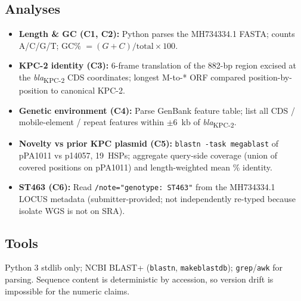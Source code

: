 \documentclass[11pt]{article}
\begin{document}
\subsection{Analyses}
\begin{itemize}[nosep]
  \item \textbf{Length \& GC (C1, C2):} Python parses the MH734334.1 FASTA; counts A/C/G/T; GC\% $= (G+C)/\text{total}\times 100$.
  \item \textbf{KPC-2 identity (C3):} 6-frame translation of the 882-bp region excised at the \textit{bla}\textsubscript{KPC-2} CDS coordinates; longest M-to-* ORF compared position-by-position to canonical KPC-2.
  \item \textbf{Genetic environment (C4):} Parse GenBank feature table; list all CDS / mobile-element / repeat features within $\pm 6$~kb of \textit{bla}\textsubscript{KPC-2}.
  \item \textbf{Novelty vs prior KPC plasmid (C5):} \texttt{blastn -task megablast} of pPA1011 vs p14057, 19~HSPs; aggregate query-side coverage (union of covered positions on pPA1011) and length-weighted mean \% identity.
  \item \textbf{ST463 (C6):} Read \texttt{/note="genotype: ST463"} from the MH734334.1 LOCUS metadata (submitter-provided; not independently re-typed because isolate WGS is not on SRA).
\end{itemize}

\subsection{Tools}
Python 3 stdlib only; NCBI BLAST+ (\texttt{blastn}, \texttt{makeblastdb}); \texttt{grep}/\texttt{awk} for parsing. Sequence content is deterministic by accession, so version drift is impossible for the numeric claims.
\end{document}
